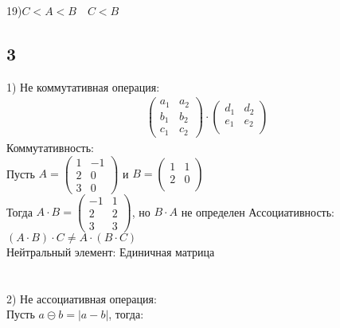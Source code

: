 		19)$C<A<B \quad C<B$\\
		\begin{center}
		\end{center}
		
		\subsection{3}
		1) Не коммутативная операция: \\
		\begin{gather*}
			\begin{pmatrix}
				a_1 & a_2\\
				b_1 & b_2\\
				c_1 & c_2
			\end{pmatrix}
		\cdot
			\begin{pmatrix}
				d_1 & d_2\\
				e_1 & e_2\\
			\end{pmatrix}
		\end{gather*}
		Коммутативность: \\
		Пусть $A = 
		\begin{pmatrix}
		1 & -1\\
		2 & 0\\
		3 & 0
		\end{pmatrix}$ и $B = 
		\begin{pmatrix}
		1 & 1\\
		2 & 0\\
		\end{pmatrix}		
		$\\
		Тогда $A \cdot B =
		\begin{pmatrix}
		-1 & 1\\
		2 & 2\\
		3 & 3
		\end{pmatrix}
		$, но $B \cdot A$ не определен
		Ассоциативность: $(A \cdot B) \cdot C \ne A \cdot (B \cdot C)$\\
		Нейтральный элемент: Единичная матрица\\ \\
		\\
		2) Не ассоциативная операция: \\
		Пусть $a \circleddash b = |a - b|$, тогда:
